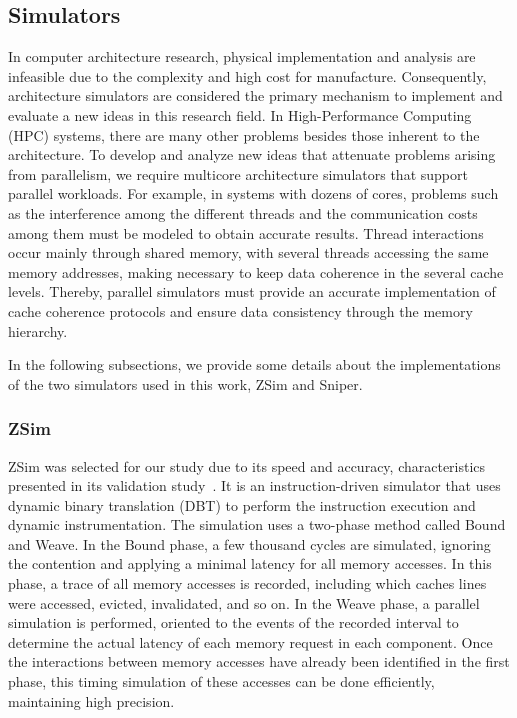 \documentclass[AMA,final,STIX1COL]{WileyNJD-v2}
\begin{document}
\subsection{Simulators}

In computer architecture research, physical implementation and analysis are infeasible due to the complexity and high cost for manufacture. 
Consequently, architecture simulators are considered the primary mechanism to implement and evaluate a new ideas in this research field.
In High-Performance Computing (HPC) systems, there are many other problems besides those inherent to the architecture.
To develop and analyze new ideas that attenuate problems arising from parallelism, we require multicore architecture simulators that support parallel workloads.
For example, in systems with dozens of cores, problems such as the interference among the different threads and the communication costs among them must be modeled to obtain accurate results.
Thread interactions occur mainly through shared memory, with several threads accessing the same memory addresses, making necessary to keep data coherence in the several cache levels.
Thereby, parallel simulators must provide an accurate implementation of cache coherence protocols and ensure data consistency through the memory hierarchy.


In the following subsections, we provide some details about the implementations of the two simulators used in this work, ZSim\cite{sanchez2013zsim} and Sniper\cite{carlson2014aeohmcm}.

\subsubsection{ZSim}\label{ref:subs_zsim}

ZSim was selected for our study due to its speed and accuracy, characteristics presented in its validation study~\cite{ZSim2016validation}.
It is an instruction-driven simulator that uses dynamic binary translation (DBT) to perform the instruction execution and dynamic instrumentation.
The simulation uses a two-phase method called Bound and Weave.
In the Bound phase, a few thousand cycles are simulated, ignoring the contention and applying a minimal latency for all memory accesses.
In this phase, a trace of all memory accesses is recorded, including which caches lines were accessed, evicted, invalidated, and so on.
In the Weave phase, a parallel simulation is performed, oriented to the events of the recorded interval to determine the actual latency of each memory request in each component.
Once the interactions between memory accesses have already been identified in the first phase, this timing simulation of these accesses can be done efficiently, maintaining high precision.
\end{document}
